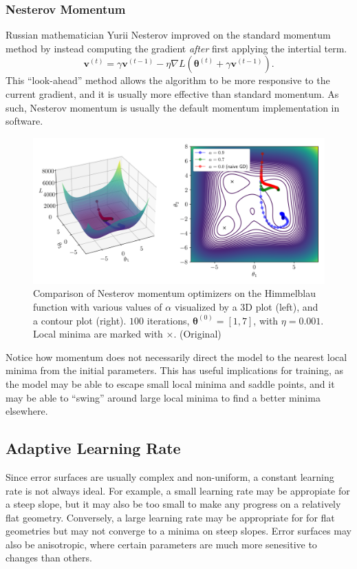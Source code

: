 \documentclass[12pt]{report}
\theoremstyle{definition}
\theoremstyle{remark}
\begin{document}
\subsubsection{Nesterov Momentum}
Russian mathematician Yurii Nesterov improved on the standard momentum method by instead computing the gradient \textit{after} first applying the intertial term.
\begin{equation}
    \mathbf{v}^{(t)} = \gamma \mathbf{v}^{(t-1)} - \eta \nabla L(\boldsymbol{\theta}^{(t)} + \gamma \mathbf{v}^{(t-1)}).
\end{equation}
This ``look-ahead'' method allows the algorithm to be more responsive to the current gradient, and it is usually more effective than standard momentum. As such, Nesterov momentum is usually the default momentum implementation in software.
\begin{figure}[h]
    \centering
    \includegraphics[width=\linewidth]{figs/nesterov_comparison.png}
    \caption{Comparison of Nesterov momentum optimizers on the Himmelblau function with various values of $\alpha$ visualized by a 3D plot (left), and a contour plot (right). $100$ iterations, $\boldsymbol{\theta}^{(0)} = [1,7]$, with $\eta = 0.001$. Local minima are marked with $\times$. (Original)}
    \label{fig:enter-label}
\end{figure}
Notice how momentum does not necessarily direct the model to the nearest local minima from the initial parameters. This has useful implications for training, as the model may be able to escape small local minima and saddle points, and it may be able to ``swing'' around large local minima to find a better minima elsewhere.

\subsection{Adaptive Learning Rate}
Since error surfaces are usually complex and non-uniform, a constant learning rate is not always ideal. For example, a small learning rate may be appropiate for a steep slope, but it may also be too small to make any progress on a relatively flat geometry. Conversely, a large learning rate may be appropriate for for flat geometries but may not converge to a minima on steep slopes. Error surfaces may also be anisotropic, where certain parameters are much more senesitive to changes than others.
\end{document}
